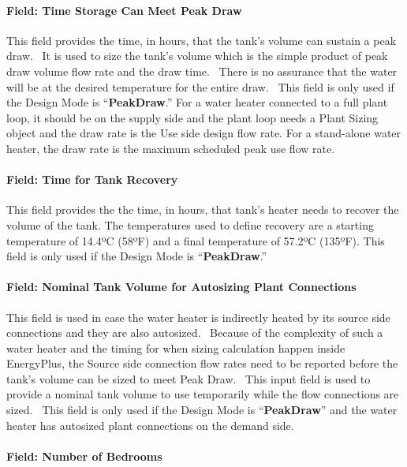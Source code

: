 \paragraph{Field: Time Storage Can Meet Peak Draw}\label{field-time-storage-can-meet-peak-draw}

This field provides the time, in hours, that the tank's volume can sustain a peak draw.~ It is used to size the tank's volume which is the simple product of peak draw volume flow rate and the draw time.~ There is no assurance that the water will be at the desired temperature for the entire draw.~ This field is only used if the Design Mode is ``\textbf{PeakDraw}.'' For a water heater connected to a full plant loop, it should be on the supply side and the plant loop needs a Plant Sizing object and the draw rate is the Use side design flow rate. For a stand-alone water heater, the draw rate is the maximum scheduled peak use flow rate.

\paragraph{Field: Time for Tank Recovery}\label{field-time-for-tank-recovery}

This field provides the the time, in hours, that tank's heater needs to recover the volume of the tank. The temperatures used to define recovery are a starting temperature of 14.4ºC (58ºF) and a final temperature of 57.2ºC (135ºF). This field is only used if the Design Mode is ``\textbf{PeakDraw}.''

\paragraph{Field: Nominal Tank Volume for Autosizing Plant Connections}\label{field-nominal-tank-volume-for-autosizing-plant-connections}

This field is used in case the water heater is indirectly heated by its source side connections and they are also autosized.~ Because of the complexity of such a water heater and the timing for when sizing calculation happen inside EnergyPlus, the Source side connection flow rates need to be reported before the tank's volume can be sized to meet Peak Draw.~ This input field is used to provide a nominal tank volume to use temporarily while the flow connections are sized.~ This field is only used if the Design Mode is ``\textbf{PeakDraw}'' and the water heater has autosized plant connections on the demand side.

\paragraph{Field: Number of Bedrooms}\label{field-number-of-bedrooms}

